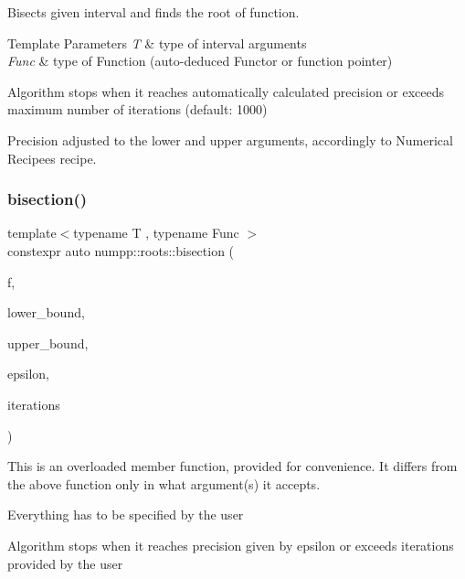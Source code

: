 Bisects given interval and finds the root of function.


\begin{DoxyTemplParams}{Template Parameters}
{\em T} & type of interval arguments \\
\hline
{\em Func} & type of Function (auto-\/deduced Functor or function pointer)\\
\hline
\end{DoxyTemplParams}
Algorithm stops when it reaches automatically calculated precision or exceeds maximum number of iterations (default\+: 1000)

Precision adjusted to the lower and upper arguments, accordingly to Numerical Recipees recipe.\mbox{\label{group__numpp__roots_ga1b4f2040358e71ad1fd2bfcc8c71a8d6}} 
\subsubsection{\texorpdfstring{bisection()}{bisection()}\hspace{0.1cm}{\footnotesize\ttfamily [2/2]}}
{\footnotesize\ttfamily template$<$typename T , typename Func $>$ \\
constexpr auto numpp\+::roots\+::bisection (\begin{DoxyParamCaption}\item[{Func \&\&}]{f,  }\item[{T \&\&}]{lower\+\_\+bound,  }\item[{T \&\&}]{upper\+\_\+bound,  }\item[{const double}]{epsilon,  }\item[{std\+::size\+\_\+t}]{iterations }\end{DoxyParamCaption})}

This is an overloaded member function, provided for convenience. It differs from the above function only in what argument(s) it accepts.

Everything has to be specified by the user

Algorithm stops when it reaches precision given by epsilon or exceeds iterations provided by the user\mbox{\label{group__numpp__roots_ga30924012d656a67696860b51d3d3f315}} 
